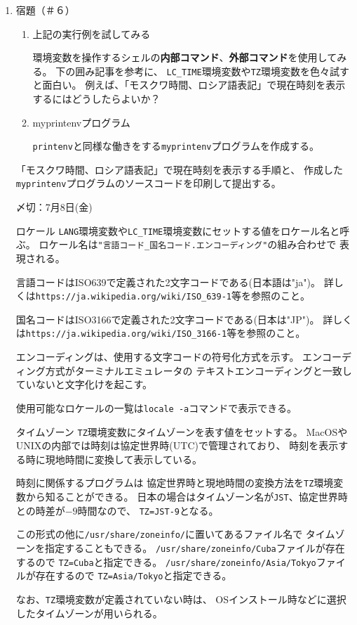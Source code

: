 \documentclass[a4j,dvipdfmx]{jarticle}
\begin{document}
\begin{enumerate}
\begin{enumerate}
\end{enumerate}

\item 宿題（＃６）

\begin{enumerate}
\item 上記の実行例を試してみる

環境変数を操作するシェルの{\bf 内部コマンド}、{\bf 外部コマンド}を使用してみる。
下の囲み記事を参考に、
\verb/LC_TIME/環境変数や\verb/TZ/環境変数を色々試すと面白い。
例えば、「モスクワ時間、ロシア語表記」で現在時刻を表示するにはどうしたらよいか？

\item myprintenvプログラム

\verb/printenv/と同様な働きをする\verb/myprintenv/プログラムを作成する。

\end{enumerate}

「モスクワ時間、ロシア語表記」で現在時刻を表示する手順と、
作成した\verb/myprintenv/プログラムのソースコードを印刷して提出する。

〆切：7月8日(金)

\begin{itembox}[l]{ロケール}
\verb/LANG/環境変数や\verb/LC_TIME/環境変数にセットする値をロケール名と呼ぶ。
ロケール名は\verb/"言語コード_国名コード.エンコーディング"/の組み合わせで
表現される。

言語コードはISO639で定義された2文字コードである(日本語は"ja")。
詳しくは\verb;https://ja.wikipedia.org/wiki/ISO_639-1;等を参照のこと。

国名コードはISO3166で定義された2文字コードである(日本は"JP")。
詳しくは\verb;https://ja.wikipedia.org/wiki/ISO_3166-1;等を参照のこと。

エンコーディングは、使用する文字コードの符号化方式を示す。
エンコーディング方式がターミナルエミュレータの
テキストエンコーディングと一致していないと文字化けを起こす。

使用可能なロケールの一覧は\verb/locale -a/コマンドで表示できる。
\end{itembox}

\begin{itembox}[l]{タイムゾーン}
\verb/TZ/環境変数にタイムゾーンを表す値をセットする。
MacOSやUNIXの内部では時刻は協定世界時(UTC)で管理されており、
時刻を表示する時に現地時間に変換して表示している。

時刻に関係するプログラムは
協定世界時と現地時間の変換方法を\verb/TZ/環境変数から知ることができる。
日本の場合はタイムゾーン名が\verb/JST/、協定世界時との時差が$-9$時間なので、
\verb/TZ=JST-9/となる。

この形式の他に\verb;/usr/share/zoneinfo/;に置いてあるファイル名で
タイムゾーンを指定することもできる。
\verb;/usr/share/zoneinfo/Cuba;ファイルが存在するので
\verb;TZ=Cuba;と指定できる。
\verb;/usr/share/zoneinfo/Asia/Tokyo;ファイルが存在するので
\verb;TZ=Asia/Tokyo;と指定できる。

なお、\verb/TZ/環境変数が定義されていない時は、
OSインストール時などに選択したタイムゾーンが用いられる。
\end{itembox}

\end{enumerate}
\end{document}
